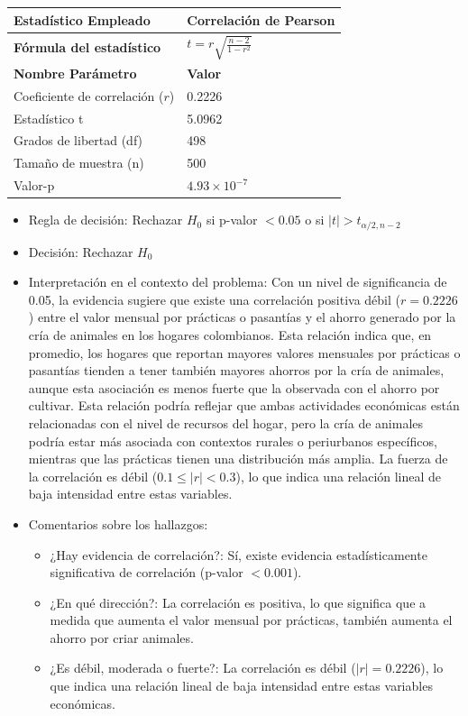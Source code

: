 \documentclass[12pt,a4paper]{article}
\begin{document}
\begin{tabular}{|m{7cm}|m{7cm}|}
\hline
\textbf{Estadístico Empleado} & Correlación de Pearson \\ \hline
\textbf{Fórmula del estadístico} & $t = r\sqrt{\frac{n-2}{1-r^2}}$ \\ \hline
\textbf{Nombre Parámetro} & \textbf{Valor} \\ \hline
Coeficiente de correlación ($r$) & 0.2226 \\ \hline
Estadístico t & 5.0962 \\ \hline
Grados de libertad (df) & 498 \\ \hline
Tamaño de muestra (n) & 500 \\ \hline
Valor-p & $4.93 \times 10^{-7}$ \\ \hline
\end{tabular}

\begin{itemize}
    \item Regla de decisión: Rechazar $H_0$ si p-valor $< 0.05$ o si $|t| > t_{\alpha/2, n-2}$
    \item Decisión: Rechazar $H_0$
    \item Interpretación en el contexto del problema: Con un nivel de significancia de 0.05, la evidencia sugiere que existe una correlación positiva débil ($r = 0.2226$) entre el valor mensual por prácticas o pasantías y el ahorro generado por la cría de animales en los hogares colombianos. Esta relación indica que, en promedio, los hogares que reportan mayores valores mensuales por prácticas o pasantías tienden a tener también mayores ahorros por la cría de animales, aunque esta asociación es menos fuerte que la observada con el ahorro por cultivar. Esta relación podría reflejar que ambas actividades económicas están relacionadas con el nivel de recursos del hogar, pero la cría de animales podría estar más asociada con contextos rurales o periurbanos específicos, mientras que las prácticas tienen una distribución más amplia. La fuerza de la correlación es débil ($0.1 \leq |r| < 0.3$), lo que indica una relación lineal de baja intensidad entre estas variables.
    \item Comentarios sobre los hallazgos:
    \begin{itemize}
        \item ¿Hay evidencia de correlación?: Sí, existe evidencia estadísticamente significativa de correlación (p-valor $< 0.001$).
        \item ¿En qué dirección?: La correlación es positiva, lo que significa que a medida que aumenta el valor mensual por prácticas, también aumenta el ahorro por criar animales.
        \item ¿Es débil, moderada o fuerte?: La correlación es débil ($|r| = 0.2226$), lo que indica una relación lineal de baja intensidad entre estas variables económicas.
    \end{itemize}
\end{itemize}
\end{document}
